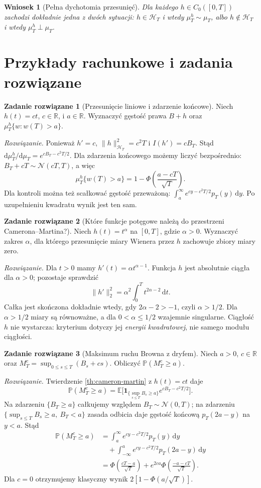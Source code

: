 \documentclass[11pt,a4paper,oneside]{report}
\numberwithin{equation}{chapter}
\theoremstyle{plain}
\newtheorem{wniosek}[twierdzenie]{Wniosek}
\theoremstyle{definition}
\newtheorem{zadanie}{Zadanie rozwiązane}[chapter]
\theoremstyle{remark}
\newcommand{\R}{\mathbb{R}}
\newcommand{\Prob}{\mathbb{P}}
\newcommand{\E}{\mathbb{E}}
\newcommand{\calH}{\mathcal{H}}
\newcommand{\ind}[1]{\mathbf{1}_{#1}}
\newcommand{\dd}{\mathrm{d}}
\newcommand{\Normal}{\mathcal{N}}
\begin{document}
\begin{wniosek}[Pełna dychotomia przesunięć]\label{cor:volIII:09:01}
Dla każdego $h\in C_0([0,T])$ zachodzi dokładnie jedna
z dwóch sytuacji: $h\in\calH_T$ i wtedy $\mu_T^h\sim\mu_T$,
albo $h\notin\calH_T$ i wtedy $\mu_T^h\perp\mu_T$.
\end{wniosek}

\section{Przykłady rachunkowe i zadania rozwiązane}\label{sec:volIII:09:06}

\begin{zadanie}[Przesunięcie liniowe i zdarzenie końcowe]
Niech $h(t)=ct$, $c\in\R$, i $a\in\R$.
Wyznaczyć gęstość prawa $B+h$ oraz
$\mu_T^h\{w:w(T)>a\}$.

\emph{Rozwiązanie.} Ponieważ $h'=c$,
$\|h\|_{\calH_T}^2=c^2T$ i $I(h')=cB_T$.
Stąd $\dd\mu_T^h/\dd\mu_T=e^{cB_T-c^2T/2}$.
Dla zdarzenia końcowego możemy liczyć bezpośrednio:
$B_T+cT\sim\Normal(cT,T)$, a więc
\[
\mu_T^h\{w(T)>a\}=1-\Phi\left(\frac{a-cT}{\sqrt T}\right).
\]
Dla kontroli można też scałkować gęstość przeważoną:
$\int_a^\infty e^{cy-c^2T/2}p_T(y)\,\dd y$.
Po uzupełnieniu kwadratu wynik jest ten sam.
\end{zadanie}

\begin{zadanie}[Które funkcje potęgowe należą do przestrzeni Camerona--Martina?]
Niech $h(t)=t^\alpha$ na $[0,T]$, gdzie $\alpha>0$.
Wyznaczyć zakres $\alpha$, dla którego przesunięcie
miary Wienera przez $h$ zachowuje zbiory miary zero.

\emph{Rozwiązanie.} Dla $t>0$ mamy
$h'(t)=\alpha t^{\alpha-1}$. Funkcja $h$ jest
absolutnie ciągła dla $\alpha>0$; pozostaje sprawdzić
\[
\|h'\|_2^2=\alpha^2\int_0^T t^{2\alpha-2}\,\dd t.
\]
Całka jest skończona dokładnie wtedy, gdy
$2\alpha-2>-1$, czyli $\alpha>1/2$.
Dla $\alpha>1/2$ miary są równoważne, a dla
$0<\alpha\le1/2$ wzajemnie singularne.
Ciągłość $h$ nie wystarcza: kryterium dotyczy jej
\emph{energii kwadratowej}, nie samego modułu ciągłości.
\end{zadanie}

\begin{zadanie}[Maksimum ruchu Browna z dryfem]
Niech $a>0$, $c\in\R$ oraz
$M_T^c=\sup_{0\le s\le T}(B_s+cs)$.
Obliczyć $\Prob(M_T^c\ge a)$.

\emph{Rozwiązanie.} Twierdzenie \ref{th:cameron-martin}
z $h(t)=ct$ daje
\[
\Prob(M_T^c\ge a)=\E\bigl[
\ind{\{\sup_{s\le T}B_s\ge a\}}e^{cB_T-c^2T/2}\bigr].
\]
Na zdarzeniu $\{B_T\ge a\}$ całkujemy względem
$B_T\sim\Normal(0,T)$; na zdarzeniu
$\{\sup_{s\le T}B_s\ge a,\ B_T<a\}$
zasada odbicia daje gęstość końcową $p_T(2a-y)$
na $y<a$. Stąd
\[
\begin{split}
\Prob(M_T^c\ge a)
&=\int_a^\infty e^{cy-c^2T/2}p_T(y)\,\dd y\\
&\quad+\int_{-\infty}^{a}e^{cy-c^2T/2}p_T(2a-y)\,\dd y\\
&=\Phi\left(\frac{cT-a}{\sqrt T}\right)
+e^{2ca}\Phi\left(\frac{-a-cT}{\sqrt T}\right).
\end{split}
\]
Dla $c=0$ otrzymujemy klasyczny wynik
$2[1-\Phi(a/\sqrt T)]$.
\end{zadanie}
\end{document}
